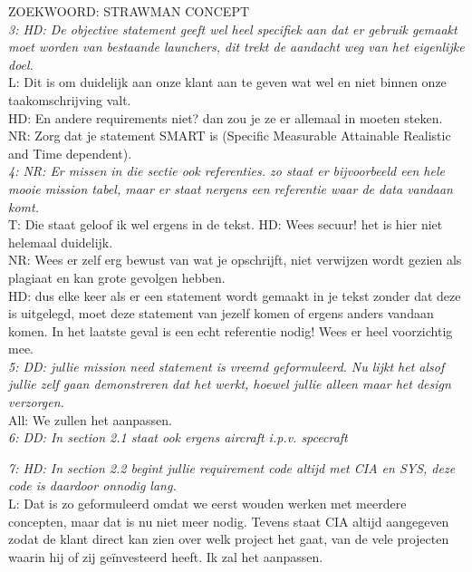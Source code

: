 ZOEKWOORD: STRAWMAN CONCEPT\\

\textit{3: HD: De objective statement geeft wel heel specifiek aan dat er gebruik gemaakt moet worden van bestaande launchers, dit trekt de aandacht weg van het eigenlijke doel.}\\
L: Dit is om duidelijk aan onze klant aan te geven wat wel en niet binnen onze taakomschrijving valt.\\
HD: En andere requirements niet? dan zou je ze er allemaal in moeten steken.\\
NR: Zorg dat je statement SMART is (Specific Measurable Attainable Realistic and Time dependent).\\

\textit{4: NR: Er missen in die sectie ook referenties. zo staat er bijvoorbeeld een hele mooie mission tabel, maar er staat nergens een referentie waar de data vandaan komt.}\\
T: Die staat geloof ik wel ergens in de tekst.
HD: Wees secuur! het is hier niet helemaal duidelijk. \\
NR: Wees er zelf erg bewust van wat je opschrijft, niet verwijzen wordt gezien als plagiaat en kan grote gevolgen hebben.\\
HD: dus elke keer als er een statement wordt gemaakt in je tekst zonder dat deze is uitgelegd, moet deze statement van jezelf komen of ergens anders vandaan komen. In het laatste geval is een echt referentie nodig! Wees er heel voorzichtig mee.\\

\textit{5: DD: jullie mission need statement is vreemd geformuleerd. Nu lijkt het alsof jullie zelf gaan demonstreren dat het werkt, hoewel jullie alleen maar het design verzorgen.}\\
All: We zullen het aanpassen.\\

\textit{6: DD: In section 2.1 staat ook ergens aircraft i.p.v. spcecraft}

\textit{7: HD: In section 2.2 begint jullie requirement code altijd met CIA en SYS, deze code is daardoor onnodig lang.}\\
L: Dat is zo geformuleerd omdat we eerst wouden werken met meerdere concepten, maar dat is nu niet meer nodig. Tevens staat CIA altijd aangegeven zodat de klant direct kan zien over welk project het gaat, van de vele projecten waarin hij of zij geïnvesteerd heeft. Ik zal het aanpassen.\\

